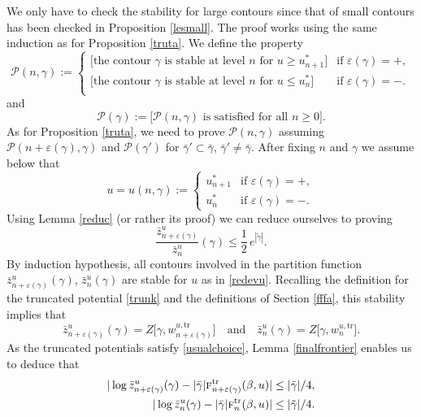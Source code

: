 \documentclass[JEP,XML,SOM,Unicode, NoFloatCountersInSection]{cedram}
\let\mathcal\mathscr
\numberwithin{equation}{section}
\theoremstyle{plain}
\theoremstyle{definition}
\newcommand{\cP}{{\ensuremath{\mathcal P}} }
\newcommand{\gb}{\beta}
\newcommand{\gep}{\varepsilon}
\newcommand{\tr}{\mathrm{tr}}
\newcommand{\tf}{\textsc{f}}
\begin{document}
We only have to check the stability for large contours since that of small contours has been checked in Proposition \ref{lesmall}.
The proof works using the same induction as for Proposition \ref{truta}.
We define the property
\begin{equation*}
\cP(n,\gamma):=\begin{cases}
\big[ \text{the contour } \gamma \text{ is stable at level } n \text{ for } u\ge u^*_{n+1} \big] &\text{if } \gep(\gamma)=+,\\
\big[ \text{the contour } \gamma \text{ is stable at level } n \text{ for } u\le u^*_{n} \big] &\text{if } \gep(\gamma)=-.\\
\end{cases}
\end{equation*}
and
\begin{equation*}
\cP(\gamma):=\big[\cP(n,\gamma) \text{ is satisfied for all } n\ge 0 \big].
\end{equation*}
As for Proposition \ref{truta},
we need to prove $\cP(n,\gamma)$ assuming $\cP(n+\gep(\gamma),\gamma)$ and $\cP(\gamma')$ for $\bar \gamma'\subset \bar\gamma$, $\bar \gamma'\ne \bar \gamma$.
After fixing $n$ and $\gamma$ we assume below that
\begin{equation}\label{redevu}
u=u(n,\gamma):= \begin{cases} u^*_{n+1} &\text{if } \gep(\gamma)=+,\\
u^*_{n} &\text{if } \gep(\gamma)=-.
\end{cases}
\end{equation}
Using Lemma \ref{reduc} (or rather its proof) we can reduce ourselves to proving
\begin{equation*}
\frac{\bar z^u_{n+\gep(\gamma)}}{\bar z^u_n}(\gamma)\le \frac{1}{2}\,e^{|\tilde\gamma|}.
\end{equation*}
By induction hypothesis, all contours involved in the partition function $\bar z^u_{n+\gep(\gamma)}(\gamma)$, $\bar z^u_n(\gamma)$
are stable for $u$ as in \eqref{redevu}.
Recalling the definition for the truncated potential \eqref{trunk} and the definitions of Section \ref{fffa},
this stability implies that
\begin{equation*}
\bar z^u_{n+\gep(\gamma)}(\gamma)=Z\bigl[\gamma, w^{u,\tr}_{n+\gep(\gamma)}\bigr] \quad\text{and}\quad \bar z^u_{n}(\gamma)=Z\bigl[\gamma, w^{u,\tr}_{n}\bigr].
\end{equation*}
As the truncated potentials satisfy \eqref{usualchoice}, Lemma \ref{finalfrontier} enables us to deduce that
\begin{equation*}
\begin{split}
|\log \bar z^u_{n+\gep(\gamma)}(\gamma)- |\bar \gamma| \tf^{\tr}_{n+\gep(\gamma)}(\gb,u) |&\le |\tilde \gamma|/4,\\
|\log \bar z^u_{n}(\gamma)- |\bar \gamma| \tf^{\tr}_{n}(\gb,u) |&\le |\tilde \gamma|/4.
\end{split}
\end{equation*}
\end{document}

